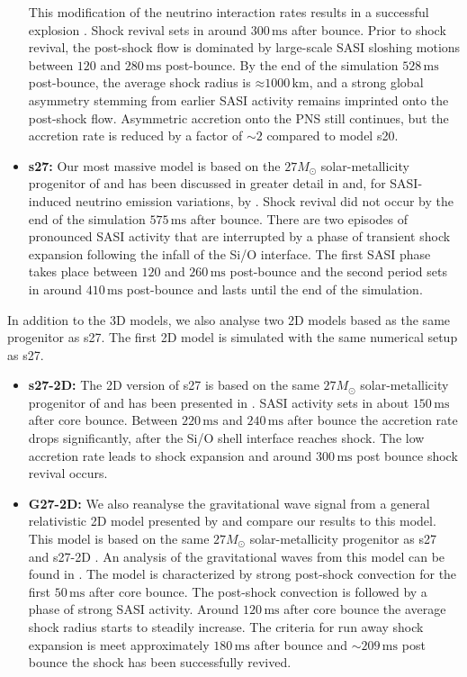 \begin{itemize}
This modification of the neutrino interaction rates results in a successful
explosion \citep{melson_15b}. Shock revival sets in around $300 \, \mathrm{ms}$ after bounce.
Prior to shock revival, the post-shock
flow is dominated by large-scale SASI sloshing motions between
$120$ and $280 \, \mathrm{ms}$ post-bounce. By the end of the
simulation $528 \, \mathrm{ms}$ post-bounce, the average shock
radius is $\mathord{\approx} 1000 \, \mathrm{km}$, and a strong global
asymmetry stemming from earlier SASI activity remains imprinted onto the post-shock flow. Asymmetric accretion onto the PNS still continues, but the accretion rate is reduced by a factor of $\mathord{\sim} 2$
compared to model s20.
\item \textbf{s27:} Our most massive model is based on the 
$27 M_\odot$ solar-metallicity progenitor of \citet{woosley_02} and has been
discussed in greater detail in \citet{hanke_13} and, for SASI-induced neutrino emission variations, by \citet{tamborra_13,tamborra_14b}.
Shock revival did not occur by the end of the simulation $575 \, \mathrm{ms}$ after
bounce. There are two episodes of pronounced SASI activity that are
interrupted by a phase of transient shock expansion following the
infall of the Si/O interface. The first SASI phase takes place
between $120$ and $260 \, \mathrm{ms}$ post-bounce and the second
period sets in around $410 \, \mathrm{ms}$ post-bounce and lasts until
the end of the simulation. 
\end{itemize}
{\comment
In addition to the 3D models, we also analyse two 2D models based as the same progenitor
as s27. The first 2D model is simulated with the same numerical setup as s27.
\begin{itemize}
\item \textbf{s27-2D:} The 2D version of s27 is based on the same 
$27 M_\odot$ solar-metallicity progenitor of \citet{woosley_02} and has been
presented in \citet{hanke_13}. SASI activity sets in about $150 \, \mathrm{ms}$ after
core bounce. Between $220 \, \mathrm{ms}$ and $240 \, \mathrm{ms}$ after bounce the accretion rate drops significantly, after the Si/O shell interface reaches shock.
The low accretion rate leads to shock expansion and around $300 \, \mathrm{ms}$ post bounce
shock revival occurs.
\end{itemize}
\begin{itemize}
\item \textbf{G27-2D:} We also reanalyse the gravitational wave 
signal from a general relativistic 2D model \citep{mueller_12b} presented 
by \citealt{mueller_13} and compare our results to this model. This model is based on the same 
$27 M_\odot$ solar-metallicity progenitor as s27 and s27-2D \citep{woosley_02}.
An analysis of the gravitational waves from this model can be found in \cite{mueller_13}.
The model is characterized by strong post-shock convection for the first $50 \, \mathrm{ms}$
after core bounce. The post-shock convection is followed by a phase of
strong SASI activity. Around $120 \, \mathrm{ms}$ after core bounce the average
shock radius starts to steadily increase. The criteria for run away shock expansion is meet
approximately $180 \, \mathrm{ms}$ after bounce and $\sim 209 \, \mathrm{ms}$ post bounce
the shock has been successfully revived.
\end{itemize}
}

